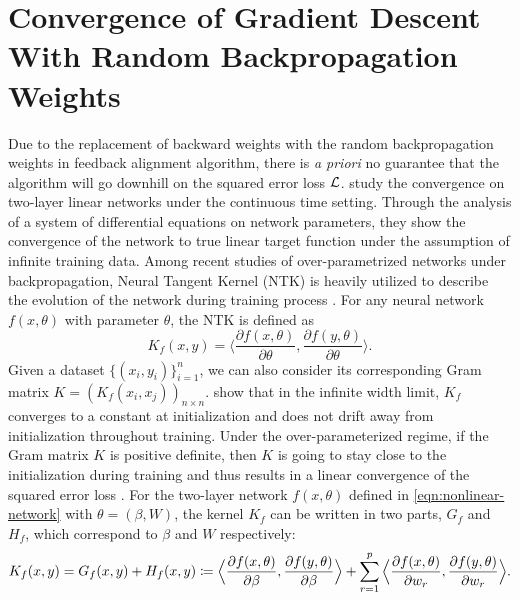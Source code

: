 
\section{Convergence of Gradient Descent With Random Backpropagation Weights}

Due to the replacement of backward weights with the random backpropagation weights in feedback alignment algorithm, there is \emph{a priori} no guarantee that the algorithm will go downhill on the squared error loss $\mathcal{L}$. \citet{lillicrap2020backpropagation} study the convergence on two-layer linear networks under the continuous time setting. Through the analysis of a system of differential equations on network parameters, they show the convergence of the network to true linear target function under the assumption of infinite training data.
Among recent studies of over-parametrized networks under backpropagation, Neural Tangent Kernel (NTK) is heavily utilized to describe the evolution of the network during training process \citep{jacot2018neural}. For any neural network $f(x,\theta)$ with parameter $\theta$, the NTK is defined as
\begin{equation*}
	K_f(x,y) = \Big\langle \frac{\partial f (x,\theta)}{\partial \theta},\frac{\partial f (y,\theta)}{\partial \theta}\Big\rangle.
\end{equation*}
Given a dataset $\{(x_i,y_i)\}_{i=1}^n$, we can also consider its corresponding Gram matrix $K = (K_f(x_i,x_j))_{n\times n}$. \citet{jacot2018neural} show that in the infinite width limit, $K_f$ converges to a constant at initialization and does not drift away from initialization throughout training. Under the over-parameterized regime, if the Gram matrix $K$ is positive definite, then $K$ is going to stay close to the initialization during training and thus results in a linear convergence of the squared error loss \citep{du2018gradient,du2019gradient,gao2020model}.
For the two-layer network $f(x, \theta)$ defined in \eqref{eqn:nonlinear-network} with $\theta = (\beta,W)$, the kernel $K_f$ can be written in two parts, $G_f$ and $H_f$, which correspond to $\beta$ and $W$ respectively:
\begin{equation}
K_f(x,y) = G_f(x, y) + H_f(x,y) \coloneqq \Big\langle \frac{\partial f (x,\theta)}{\partial \beta},\frac{\partial f (y,\theta)}{\partial \beta}\Big\rangle + \sum_{r=1}^p\Big\langle \frac{\partial f (x,\theta)}{\partial w_r},\frac{\partial f (y,\theta)}{\partial w_r}\Big\rangle.
\end{equation}
